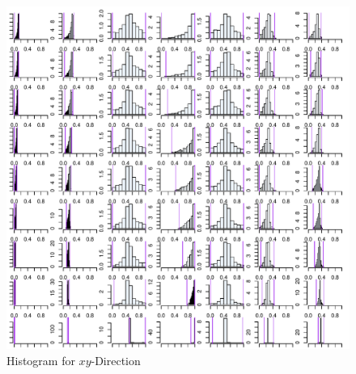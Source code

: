 \begin{figure}[ht]
   \begin{center}
    \includegraphics[width=1.0\textwidth]{YalphaProgression.pdf}
  \end{center}
  \caption{Histogram for $xy$-Direction}
  \label{fig_yhisto}
\end{figure}

